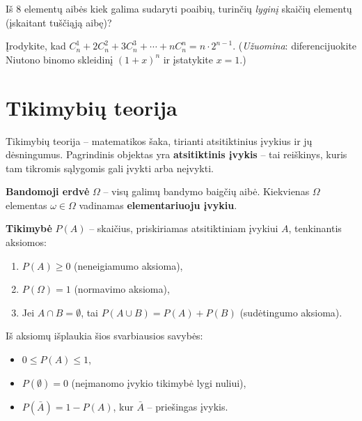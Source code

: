 \begin{exercise}
Iš $8$ elementų aibės kiek galima sudaryti poaibių, turinčių \emph{lyginį} skaičių elementų (įskaitant tuščiąją aibę)?
\end{exercise}

\begin{exercise}
Įrodykite, kad $C_n^1 + 2C_n^2 + 3C_n^3 + \cdots + nC_n^n = n \cdot 2^{n-1}$.
(\emph{Užuomina}: diferencijuokite Niutono binomo skleidinį $(1+x)^n$ ir įstatykite $x = 1$.)
\end{exercise}

\section{Tikimybių teorija}

Tikimybių teorija – matematikos šaka, tirianti atsitiktinius įvykius ir jų dėsningumus. Pagrindinis objektas yra \textbf{atsitiktinis įvykis} – tai reiškinys, kuris tam tikromis sąlygomis gali įvykti arba neįvykti.

\begin{definition}
\textbf{Bandomoji erdvė} $\Omega$ – visų galimų bandymo baigčių aibė. Kiekvienas $\Omega$ elementas $\omega \in \Omega$ vadinamas \textbf{elementariuoju įvykiu}.
\end{definition}

\begin{definition}
\textbf{Tikimybė} $P(A)$ – skaičius, priskiriamas atsitiktiniam įvykiui $A$, tenkinantis aksiomos:
\begin{enumerate}
    \item $P(A) \geq 0$ (neneigiamumo aksioma),
    \item $P(\Omega) = 1$ (normavimo aksioma),
    \item Jei $A \cap B = \emptyset$, tai $P(A \cup B) = P(A) + P(B)$ (sudėtingumo aksioma).
\end{enumerate}
\end{definition}

\begin{remark}
Iš aksiomų išplaukia šios svarbiausios savybės:
\begin{itemize}
    \item $0 \leq P(A) \leq 1$,
    \item $P(\emptyset) = 0$ (neįmanomo įvykio tikimybė lygi nuliui),
    \item $P(\bar{A}) = 1 - P(A)$, kur $\bar{A}$ – priešingas įvykis.
\end{itemize}
\end{remark}

